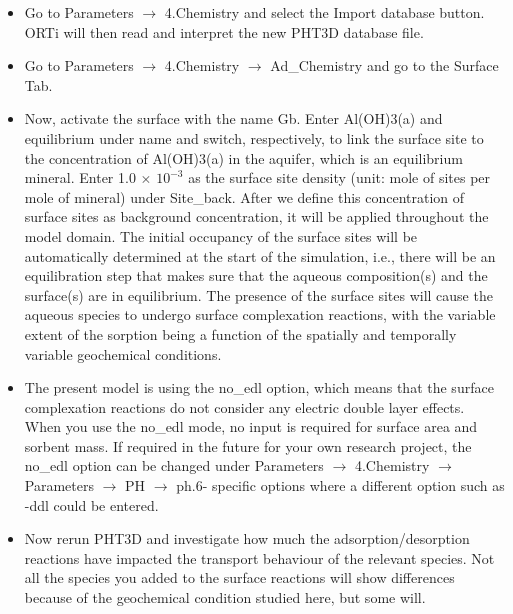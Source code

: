 \begin{itemize}

\item Go to {\color{blue}Parameters} $\rightarrow$  {\color{blue}4.Chemistry} and select the {\color{blue}Import database} button. ORTi will then read and interpret the new PHT3D database file.

\item Go to {\color{blue}Parameters} $\rightarrow$ {\color{blue}4.Chemistry} $\rightarrow$ {\color{blue}Ad\_Chemistry} and go to the {\color{blue}Surface} Tab. 

\item Now, activate the surface with the name Gb. Enter Al(OH)3(a) and equilibrium under name and switch, respectively, to link the surface site to the concentration of Al(OH)3(a) in the aquifer, which is an equilibrium mineral. Enter 1.0 $\times$ $10^{-3}$ as the surface site density (unit: mole of sites per mole of mineral) under {\color{blue}Site\_back}. After we define this concentration of surface sites as background concentration, it will be applied throughout the model domain. The initial occupancy of the surface sites will be automatically determined at the start of the simulation, i.e., there will be an equilibration step that makes sure that the aqueous composition(s) and the surface(s) are in equilibrium. The presence of the surface sites will cause the aqueous species to undergo surface complexation reactions, with the variable extent of the sorption being a function of the spatially and temporally variable geochemical conditions.

\item The present model is using the {\color{blue}no\_edl} option, which means that the surface complexation reactions do not consider any electric double layer effects. When you use the {\color{blue}no\_edl} mode, no input is required for surface area and sorbent mass. If required in the future for your own research project, 
the {\color{blue}no\_edl} option can be changed under {\color{blue}Parameters} $\rightarrow$  {\color{blue}4.Chemistry} $\rightarrow$ {\color{blue}Parameters} $\rightarrow$ {\color{blue}PH} $\rightarrow$ {\color{blue}ph.6- specific options} where a different option such as {\color{blue}-ddl} could be entered.

\item Now rerun PHT3D and investigate how much the adsorption/desorption reactions have impacted the transport behaviour of the relevant species. Not all the species you added to the surface reactions will show differences because of the geochemical condition studied here, but some will.


\end{itemize}
